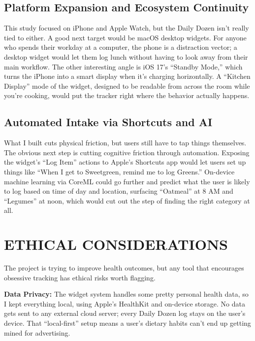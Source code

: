 \documentclass[10pt,twocolumn]{article}
\begin{document}
\subsection{Platform Expansion and Ecosystem Continuity}

This study focused on iPhone and Apple Watch, but the Daily Dozen isn't really tied to either.\cite{GregerHowNotToDie} A good next target would be macOS desktop widgets.\cite{AppleHIGWidgets} For anyone who spends their workday at a computer, the phone is a distraction vector; a desktop widget would let them log lunch without having to look away from their main workflow. The other interesting angle is iOS 17's ``Standby Mode,'' which turns the iPhone into a smart display when it's charging horizontally. A ``Kitchen Display'' mode of the widget, designed to be readable from across the room while you're cooking, would put the tracker right where the behavior actually happens.

\subsection{Automated Intake via Shortcuts and AI}

What I built cuts physical friction, but users still have to tap things themselves. The obvious next step is cutting cognitive friction through automation. Exposing the widget's ``Log Item'' actions to Apple's Shortcuts app would let users set up things like ``When I get to Sweetgreen, remind me to log Greens.'' On-device machine learning via CoreML could go further and predict what the user is likely to log based on time of day and location, surfacing ``Oatmeal'' at 8 AM and ``Legumes'' at noon, which would cut out the step of finding the right category at all.

\section{ETHICAL CONSIDERATIONS}

The project is trying to improve health outcomes, but any tool that encourages obsessive tracking has ethical risks worth flagging.

\noindent\textbf{Data Privacy:} The widget system handles some pretty personal health data, so I kept everything local, using Apple's HealthKit and on-device storage.\cite{AppleHIGWidgets} No data gets sent to any external cloud server; every Daily Dozen log stays on the user's device. That ``local-first'' setup means a user's dietary habits can't end up getting mined for advertising.
\end{document}
